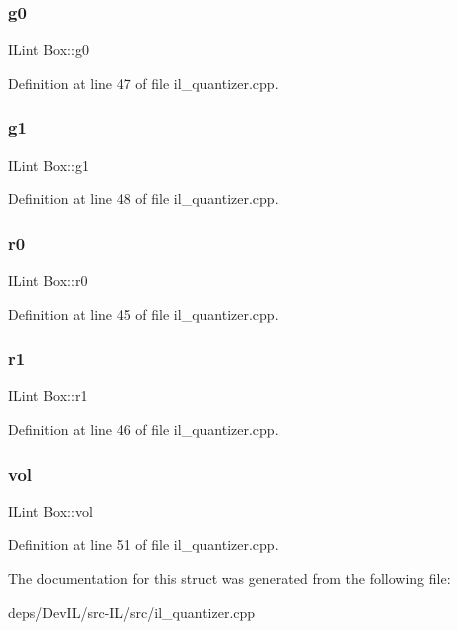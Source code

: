 \subsubsection{\texorpdfstring{g0}{g0}}
{\footnotesize\ttfamily I\+Lint Box\+::g0}



Definition at line 47 of file il\+\_\+quantizer.\+cpp.

\mbox{\label{structBox_a00b163f91a510bb969b88603c6ba84b8}} 
\subsubsection{\texorpdfstring{g1}{g1}}
{\footnotesize\ttfamily I\+Lint Box\+::g1}



Definition at line 48 of file il\+\_\+quantizer.\+cpp.

\mbox{\label{structBox_a85d1f8f6fd6c782709e5019e3b8c4832}} 
\subsubsection{\texorpdfstring{r0}{r0}}
{\footnotesize\ttfamily I\+Lint Box\+::r0}



Definition at line 45 of file il\+\_\+quantizer.\+cpp.

\mbox{\label{structBox_a11860ae70432dd576a0037fd6c20531c}} 
\subsubsection{\texorpdfstring{r1}{r1}}
{\footnotesize\ttfamily I\+Lint Box\+::r1}



Definition at line 46 of file il\+\_\+quantizer.\+cpp.

\mbox{\label{structBox_a95418da29af68d4dcf91d8e48e46ffbc}} 
\subsubsection{\texorpdfstring{vol}{vol}}
{\footnotesize\ttfamily I\+Lint Box\+::vol}



Definition at line 51 of file il\+\_\+quantizer.\+cpp.



The documentation for this struct was generated from the following file\+:\begin{DoxyCompactItemize}
\item 
deps/\+Dev\+I\+L/src-\/\+I\+L/src/il\+\_\+quantizer.\+cpp\end{DoxyCompactItemize}
